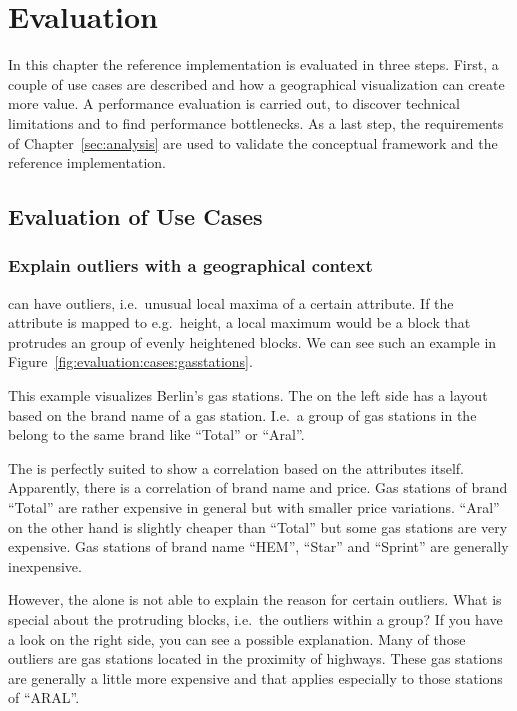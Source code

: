 \chapter{Evaluation}\label{sec:evaluation}

In this chapter the reference implementation is evaluated in three steps.
First, a couple of use cases are described and how a geographical visualization can create more value.
A performance evaluation is carried out, to discover technical limitations and to find performance bottlenecks.
As a last step, the requirements of Chapter~\ref{sec:analysis} are used to validate the conceptual framework and the reference implementation.

\section{Evaluation of Use Cases}\label{sec:use-case}



\subsection{Explain outliers with a geographical context}

\tmaps{} can have outliers, i.e.\ unusual local maxima of a certain attribute.
If the attribute is mapped to e.g.\ height, a local maximum would be a block that protrudes an group of evenly heightened blocks.
We can see such an example in Figure~\ref{fig:evaluation:cases:gasstations}.

This example visualizes Berlin's gas stations.
The \tmap{} on the left side has a layout based on the brand name of a gas station.
I.e.\ a group of gas stations in the \tmap{} belong to the same brand like ``Total'' or ``Aral''.

The \tmap{} is perfectly suited to show a correlation based on the attributes itself.
Apparently, there is a correlation of brand name and price.
Gas stations of brand ``Total'' are rather expensive in general but with smaller price variations.
``Aral'' on the other hand is slightly cheaper than ``Total'' but some gas stations are very expensive.
Gas stations of brand name ``HEM'', ``Star'' and ``Sprint'' are generally inexpensive.

However, the \tmap{} alone is not able to explain the reason for certain outliers.
What is special about the protruding blocks, i.e.\ the outliers within a group?
If you have a look on the right side, you can see a possible explanation.
Many of those outliers are gas stations located in the proximity of highways.
These gas stations are generally a little more expensive and that applies especially to those stations of ``ARAL''.


